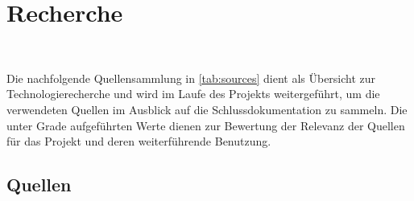 \documentclass[main.tex]{subfiles} %
\begin{document}

\section{Recherche}~\label{appendix:Recherche}

\noindent
Die nachfolgende Quellensammlung in \autoref{tab:sources} dient als Übersicht
zur Technologierecherche und wird im Laufe des Projekts
weitergeführt, um die verwendeten Quellen im Ausblick auf die
Schlussdokumentation zu sammeln. Die unter Grade aufgeführten Werte
dienen zur Bewertung der Relevanz der Quellen für das Projekt und
deren weiterführende Benutzung.

\subsection{Quellen}
\end{document}
